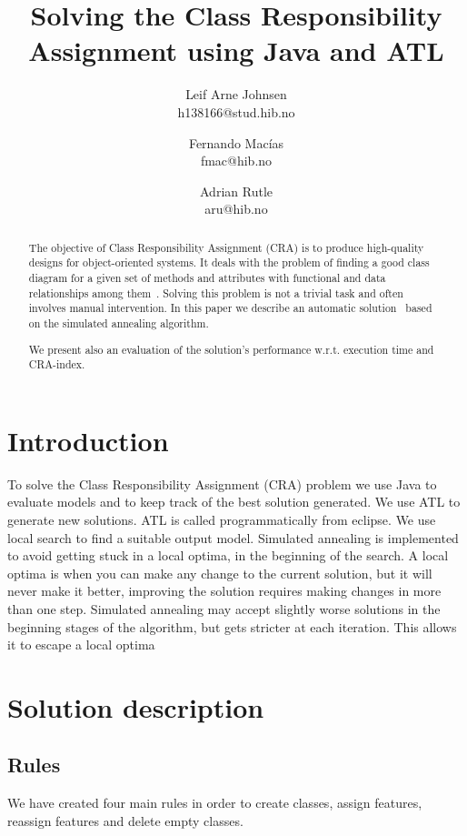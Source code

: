 \documentclass[a4paper]{article}
\title{Solving the Class Responsibility Assignment using Java and ATL}
\author{
Leif Arne Johnsen \\ h138166@stud.hib.no
\and
Fernando Macías \\ fmac@hib.no
\and
Adrian Rutle \\ aru@hib.no
}
\begin{document}
\maketitle

\begin{abstract}
The objective of Class Responsibility Assignment (CRA) is to produce high-quality designs for object-oriented systems. 
It deals with the problem of finding a good class diagram for a given set of methods and attributes with functional and data
relationships among them~\cite{BowmanBL10}.
Solving this problem is not a trivial task and often involves manual intervention.
In this paper we describe an automatic solution~\cite{XPTUeJavaAtlvdi} based on the simulated annealing algorithm.

We present also an evaluation of the solution's performance w.r.t. execution time and CRA-index.
\end{abstract}


\section{Introduction}

To solve the Class Responsibility Assignment (CRA) problem we use Java to evaluate models and to keep track of
the best solution generated.
We use ATL to generate new solutions. ATL is called
programmatically from eclipse.
We use local search to find a suitable output
model.
Simulated annealing is implemented to avoid getting stuck in a local
optima, in the beginning of the search.
A local optima is when you can make
any change to the current solution, but it will never make it better, improving
the solution requires making changes in more than one step.
Simulated
annealing may accept slightly worse solutions in the beginning stages of the
algorithm, but gets stricter at each iteration.
This allows it to escape a local
optima

\section{Solution description}

\subsection{Rules}

We have created four main rules in order to create classes, assign features, reassign features and delete empty classes.
\end{document}
